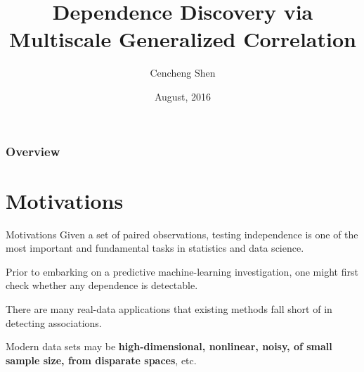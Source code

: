 \documentclass{beamer}
\title[JSM2016]{Dependence Discovery via Multiscale Generalized Correlation}
\author{Cencheng Shen} %
\institute[] %
{
\textit{Joint Work with Joshua T. Vogelstein \& Mauro Maggioni \& Carey E. Priebe} \\
}
\date{August, 2016} %
\begin{document}

\begin{frame}
\titlepage %
\end{frame}

\begin{frame}
\frametitle{Overview} %
\tableofcontents %
\end{frame}

\section{Motivations}
\begin{frame}{Motivations}
Given a set of paired observations, testing independence is one of the most important and fundamental tasks in statistics and data science.

\pause
\medskip
Prior to embarking on a predictive machine-learning investigation, one might first check whether any dependence is detectable.

\pause
\medskip
There are many real-data applications that existing methods fall short of in detecting associations.

\pause
\medskip
Modern data sets may be \textbf{high-dimensional, nonlinear, noisy, of small sample size, from disparate spaces}, etc.
\end{frame}
\end{document}
